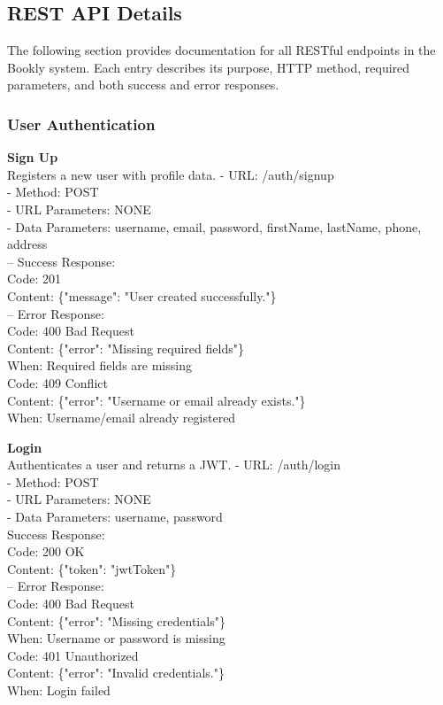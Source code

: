 \subsection*{REST API Details}

The following section provides documentation for all RESTful endpoints in the Bookly system. Each entry describes its purpose, HTTP method, required parameters, and both success and error responses.

\subsubsection*{User Authentication}

\textbf{Sign Up} \\
Registers a new user with profile data.
- URL: /auth/signup \\
- Method: POST \\
- URL Parameters: NONE \\
- Data Parameters: username, email, password, firstName, lastName, phone, address \\
– Success Response: \\
Code: 201 \\
Content: \{"message": "User created successfully."\} \\
– Error Response: \\
Code: 400 Bad Request \\
Content: \{"error": "Missing required fields"\} \\
When: Required fields are missing \\
Code: 409 Conflict \\
Content: \{"error": "Username or email already exists."\} \\
When: Username/email already registered

\textbf{Login} \\
Authenticates a user and returns a JWT.
- URL: /auth/login \\
- Method: POST \\
- URL Parameters: NONE \\
- Data Parameters: username, password \\
Success Response: \\
Code: 200 OK \\
Content: \{"token": "jwtToken"\} \\
– Error Response: \\
Code: 400 Bad Request \\
Content: \{"error": "Missing credentials"\} \\
When: Username or password is missing \\
Code: 401 Unauthorized \\
Content: \{"error": "Invalid credentials."\} \\
When: Login failed

